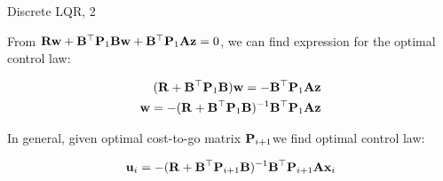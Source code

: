 \documentclass{beamer}
\begin{document}
\begin{frame}{Discrete LQR, 2}
	\begin{flushleft}
		
		From $\mathbf{R}\mathbf{w} + \mathbf{B}^\top \mathbf{P}_1 \mathbf{B} \mathbf{w} + \mathbf{B}^\top \mathbf{P}_1 \mathbf{A}\mathbf{z} = 0$, we can find expression for the optimal control law:
		
		\begin{align}
			(\mathbf{R} + \mathbf{B}^\top \mathbf{P}_1 \mathbf{B}) \mathbf{w} = -\mathbf{B}^\top \mathbf{P}_1 \mathbf{A}\mathbf{z}
			\\
			\mathbf{w} = -(\mathbf{R} + \mathbf{B}^\top \mathbf{P}_1 \mathbf{B})^{-1} \mathbf{B}^\top \mathbf{P}_1 \mathbf{A}\mathbf{z}
		\end{align}
		
		In general, given optimal cost-to-go matrix $\mathbf{P}_{i+1}$we find optimal control law:
		
		\begin{equation}
			\mathbf{u}_i = -(\mathbf{R} + \mathbf{B}^\top \mathbf{P}_{i+1} \mathbf{B})^{-1} \mathbf{B}^\top \mathbf{P}_{i+1} \mathbf{A}\mathbf{x}_i
		\end{equation}
		
		
	\end{flushleft}
\end{frame}
\end{document}
